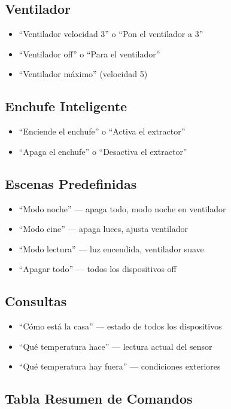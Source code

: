 \subsection{Ventilador}
\begin{itemize}
    \item ``Ventilador velocidad 3'' o ``Pon el ventilador a 3''
    \item ``Ventilador off'' o ``Para el ventilador''
    \item ``Ventilador máximo'' (velocidad 5)
\end{itemize}

\subsection{Enchufe Inteligente}
\begin{itemize}
    \item ``Enciende el enchufe'' o ``Activa el extractor''
    \item ``Apaga el enchufe'' o ``Desactiva el extractor''
\end{itemize}

\subsection{Escenas Predefinidas}
\begin{itemize}
    \item ``Modo noche'' --- apaga todo, modo noche en ventilador
    \item ``Modo cine'' --- apaga luces, ajusta ventilador
    \item ``Modo lectura'' --- luz encendida, ventilador suave
    \item ``Apagar todo'' --- todos los dispositivos off
\end{itemize}

\subsection{Consultas}
\begin{itemize}
    \item ``Cómo está la casa'' --- estado de todos los dispositivos
    \item ``Qué temperatura hace'' --- lectura actual del sensor
    \item ``Qué temperatura hay fuera'' --- condiciones exteriores
\end{itemize}

\subsection{Tabla Resumen de Comandos}

